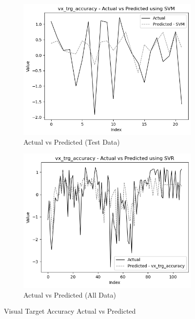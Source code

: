 \begin{figure}[htbp]
    \centering
    \begin{subfigure}[b]{0.49\textwidth}
        \centering
        \includegraphics[width=\textwidth]{images/regressionCharts/test_data_visual_target_accuracy.png}
        \caption{Actual vs Predicted (Test Data)}
        \label{fig:actual_vs_predicted_vx_trg_accuracy_test}
    \end{subfigure}\hfill
    \begin{subfigure}[b]{0.49\textwidth}
        \centering
        \includegraphics[width=\textwidth]{images/regressionCharts/all_data_visual_target_accuracy.png}
        \caption{Actual vs Predicted (All Data)}
        \label{fig:actual_vs_predicted_vx_trg_accuracy_all_data}
    \end{subfigure}
    \caption{Visual Target Accuracy Actual vs Predicted}
    \label{fig:visual_target_accuracy_comparison}
\end{figure}

